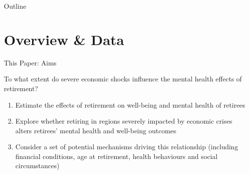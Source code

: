 \documentclass{beamer}
\begin{document}
\begin{frame}{Outline}
 \tableofcontents
\end{frame}

\section{Overview \& Data}

\begin{frame}{This Paper: Aims}

\footnotesize
\begin{block}{}
\centering
To what extent do severe economic shocks influence the mental health effects of retirement?

\end{block}

   \vspace{0.25cm}
  
\begin{enumerate}

\footnotesize
\item<2-> Estimate the effects of \begingroup\color{Blue}retirement \endgroup on \begingroup\color{Blue}well-being \endgroup and \begingroup\color{Blue}mental \endgroup health of retirees

   \vspace{0.25cm}
   
\item<3-> Explore whether \begingroup\color{Blue}retiring in regions severely impacted by economic crises  \endgroup alters retirees' mental health and well-being outcomes

   \vspace{0.25cm}
   
\item<4-> Consider a set of potential \begingroup\color{Blue}mechanisms  \endgroup  driving this relationship (including financial conditions, age at retirement, health behaviours and social circumstances)
\end{enumerate}


\end{frame}
\end{document}
